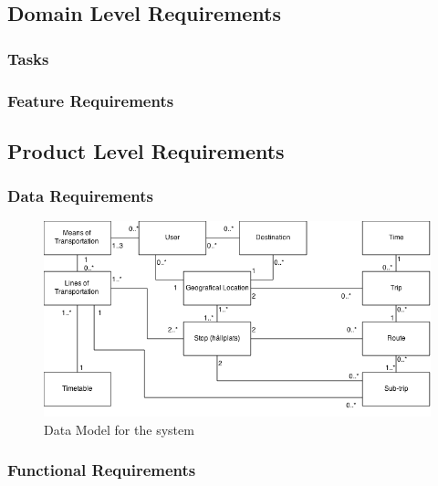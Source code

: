 \documentclass[a4paper]{article}
\begin{document}
		\subsection{Domain Level Requirements}
			\subsubsection{Tasks}
				
			\subsubsection{Feature Requirements}

								
		
		\pagebreak		
	
		\subsection{Product Level Requirements}		
			\subsubsection{Data Requirements}
			
			
			
				\begin{figure}[h]
					\includegraphics[scale=0.50]{img/datamodel-v2.png}
					\caption{Data Model for the system}
				\end{figure}
			
			
			\pagebreak
			\subsubsection{Functional Requirements}
				
		
\end{document}
